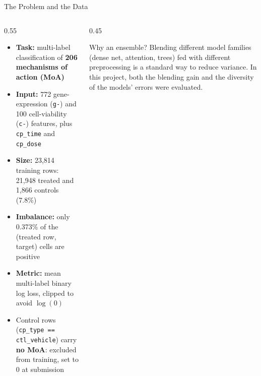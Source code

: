 \documentclass[9pt,aspectratio=169]{beamer}
\begin{document}
\begin{frame}{The Problem and the Data}
  \begin{columns}[T]
    \begin{column}{0.55\textwidth}
      \begin{itemize}
        \item \textbf{Task:} multi-label classification of \textbf{206 mechanisms of action (MoA)}
        \item \textbf{Input:} 772 gene-expression (\texttt{g-}) and 100 cell-viability (\texttt{c-}) features, plus \texttt{cp\_time} and \texttt{cp\_dose}
        \item \textbf{Size:} 23,814 training rows: 21,948 treated and 1,866 controls (7.8\%)
        \item \textbf{Imbalance:} only 0.373\% of the (treated row, target) cells are positive
        \item \textbf{Metric:} mean multi-label binary log loss, clipped to avoid $\log(0)$
        \item Control rows (\texttt{cp\_type == ctl\_vehicle}) carry \textbf{no MoA}: excluded from training, set to 0 at submission
      \end{itemize}
    \end{column}
    \begin{column}{0.45\textwidth}
      \begin{block}{Why an ensemble?}
        Blending different model families (dense net, attention, trees) fed with different preprocessing is a standard way to reduce variance. In this project, both the blending gain and the diversity of the models' errors were evaluated.
      \end{block}
    \end{column}
  \end{columns}
\end{frame}
\end{document}
